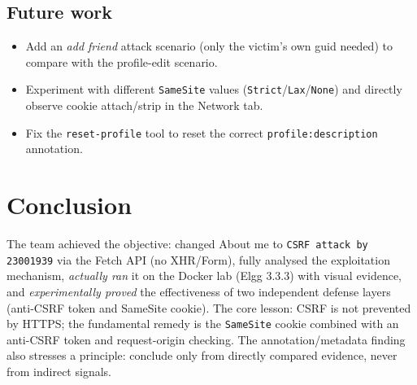 \documentclass[11pt,a4paper]{article}
\begin{document}
\subsection{Future work}
\begin{itemize}
  \item Add an \emph{add friend} attack scenario (only the victim's own guid needed) to compare with the profile-edit scenario.
  \item Experiment with different \texttt{SameSite} values (\texttt{Strict}/\texttt{Lax}/\texttt{None}) and directly observe cookie attach/strip in the Network tab.
  \item Fix the \texttt{reset-profile} tool to reset the correct \texttt{profile:description} annotation.
\end{itemize}

\section{Conclusion}
The team achieved the objective: changed About me to \texttt{CSRF attack by 23001939} via the Fetch API (no XHR/Form), fully analysed the exploitation mechanism, \emph{actually ran} it on the Docker lab (Elgg 3.3.3) with visual evidence, and \emph{experimentally proved} the effectiveness of two independent defense layers (anti-CSRF token and SameSite cookie). The core lesson: CSRF is not prevented by HTTPS; the fundamental remedy is the \texttt{SameSite} cookie combined with an anti-CSRF token and request-origin checking. The annotation/metadata finding also stresses a principle: conclude only from directly compared evidence, never from indirect signals.

\appendix
\end{document}
